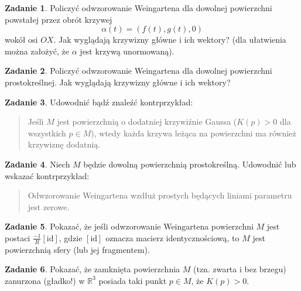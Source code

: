 \documentclass[a4paper,11pt]{article}
\theoremstyle{definition}\newtheorem{exercise}{Zadanie}
\theoremstyle{definition}\newtheorem{remark}{Uwaga}
\begin{document}
\begin{exercise}
Policzyć odwzorowanie Weingartena dla dowolnej powierzchni powstałej przez obrót krzywej \[\alpha(t)=(f(t),g(t),0)\] wokół osi $OX$. Jak wyglądają krzywizny główne i ich wektory? (dla ułatwienia można założyć, że $\alpha$ jest krzywą unormowaną).
\end{exercise}

\begin{exercise}
Policzyć odwzorowanie Weingartena dla dowolnej powierzchni prostokreślnej. Jak wyglądają krzywizny główne i ich wektory?
\end{exercise}


\begin{exercise}
Udowodnić bądź znaleźć kontrprzykład:
\begin{quote}
Jeśli $M$ jest powierzchnią o dodatniej krzywiźnie Gaussa ($K(p)>0$ dla 
wszystkich $p\in M$), wtedy każda krzywa leżąca na powierzchni ma również 
krzywiznę dodatnią.
\end{quote}

\end{exercise}



\begin{exercise}
Niech $M$ będzie dowolną powierzchnią prostokreślną. Udowodnić lub wskazać 
kontrprzykład: 
\begin{quote}
Odwzorowanie Weingartena wzdłuż prostych będących liniami parametru jest 
zerowe. 
\end{quote}

\end{exercise}


\begin{exercise}
Pokazać, że jeśli odwzorowanie Weingartena powierzchni $M$ jest postaci $\frac{-1	}{R}[\text{id}]$, gdzie $[\text{id}]$ oznacza macierz identycznościową, to $M$ jest powierzchnią sfery (lub jej fragmentem).
\end{exercise}

\begin{exercise}
 Pokazać, że zamknięta powierzchnia $M$ (tzn. zwarta i bez brzegu) zanurzona 
(gładko!) w $\mathbb{R}^3$ posiada taki punkt $p\in M$, że $K(p)> 0$.
\end{exercise}
\end{document}
